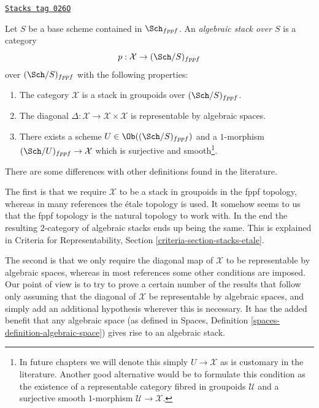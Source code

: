 \begin{definition}
\label{algebraic-definition-algebraic-stack}
\href{https://stacks.math.columbia.edu/tag/026O}{\texttt{Stacks tag 026O}}

Let $S$ be a base scheme contained in $\Sch_{fppf}$.
An {\it algebraic stack over $S$} is a category
$$
p : \mathcal{X} \to (\Sch/S)_{fppf}
$$
over $(\Sch/S)_{fppf}$ with the following properties:
\begin{enumerate}
\item The category $\mathcal{X}$ is a stack in groupoids over
$(\Sch/S)_{fppf}$.
\item The diagonal
$\Delta : \mathcal{X} \to \mathcal{X} \times \mathcal{X}$
is representable by algebraic spaces.
\item There exists a scheme $U \in \Ob((\Sch/S)_{fppf})$
and a $1$-morphism $(\Sch/U)_{fppf} \to \mathcal{X}$
which is surjective and smooth\footnote{In future chapters we will denote
this simply $U \to \mathcal{X}$ as is customary in the literature. Another
good alternative would be to formulate this condition as the existence of a
representable category fibred in groupoids $\mathcal{U}$ and a surjective
smooth $1$-morphism $\mathcal{U} \to \mathcal{X}$.}.
\end{enumerate}
\end{definition}

There are some differences with other definitions found in the literature.

\medskip\noindent
The first is that we require $\mathcal{X}$ to be a stack in groupoids
in the fppf topology, whereas in many references the \'etale topology is
used. It somehow seems to us that the fppf topology is the natural topology
to work with. In the end the resulting $2$-category of algebraic stacks
ends up being the same. This is explained in
Criteria for Representability, Section \ref{criteria-section-stacks-etale}.

\medskip\noindent
The second is that we only require the diagonal map of $\mathcal{X}$ to be
representable by algebraic spaces, whereas in most references some other
conditions are imposed. Our point of view is to try to prove a certain
number of the results that follow only assuming that the diagonal
of $\mathcal{X}$ be representable by algebraic spaces, and simply add
an additional hypothesis wherever this is necessary. It has the added
benefit that any algebraic space (as defined in
Spaces, Definition \ref{spaces-definition-algebraic-space})
gives rise to an algebraic stack.


